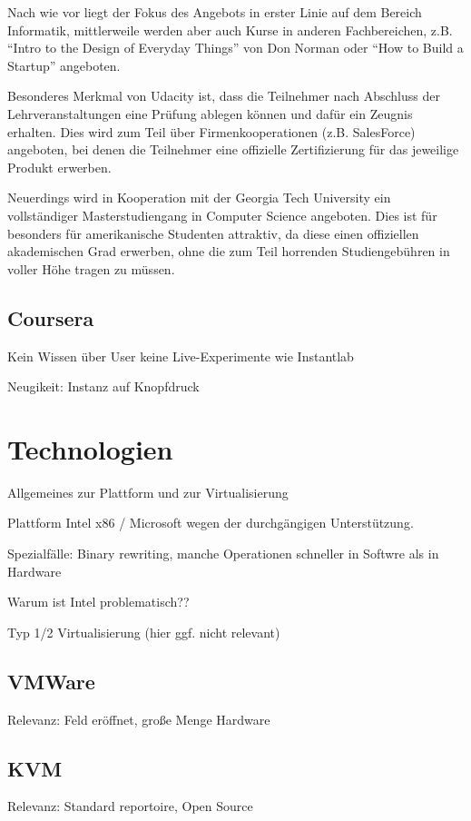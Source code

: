 			Nach wie vor liegt der Fokus des Angebots in erster Linie auf dem Bereich Informatik, mittlerweile werden aber auch Kurse in anderen Fachbereichen, z.B. "`Intro to the Design of Everyday Things"' von Don Norman oder "`How to Build a Startup"' angeboten.

			Besonderes Merkmal von Udacity ist, dass die Teilnehmer nach Abschluss der Lehrveranstaltungen eine Prüfung ablegen können und dafür ein Zeugnis erhalten.
			Dies wird zum Teil über Firmenkooperationen (z.B. SalesForce) angeboten, bei denen die Teilnehmer eine offizielle Zertifizierung für das jeweilige Produkt erwerben.

			Neuerdings wird in Kooperation mit der Georgia Tech University ein vollständiger Masterstudiengang in Computer Science angeboten.
			Dies ist für besonders für amerikanische Studenten attraktiv, da diese einen offiziellen akademischen Grad erwerben, ohne die zum Teil horrenden Studiengebühren in voller Höhe tragen zu müssen.

		\subsection{Coursera}

		Kein Wissen über User
		keine Live-Experimente wie Instantlab
		
		Neugikeit: Instanz auf Knopfdruck
		
\section{Technologien}
\label{sec:technologies}

		Allgemeines zur Plattform und zur Virtualisierung

		Plattform Intel x86 / Microsoft wegen der durchgängigen Unterstützung. \cite{PopekGoldberg}

		Spezialfälle: Binary rewriting, manche Operationen schneller in Softwre als in Hardware

		Warum ist Intel problematisch??

		Typ 1/2 Virtualisierung (hier ggf. nicht relevant)


		\subsection{VMWare}

		Relevanz: Feld eröffnet, große Menge Hardware

		\subsection{KVM}

		Relevanz: Standard reportoire, Open Source

		